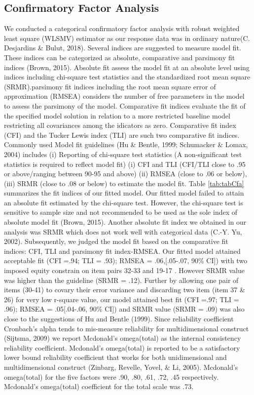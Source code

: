 \documentclass[
  english,
  man]{apa6}
\begin{document}
\hypertarget{confirmatory-factor-analysis}{%
\subsection{Confirmatory Factor Analysis}\label{confirmatory-factor-analysis}}

We conducted a categorical confirmatory factor analysis with robust weighted least square (WLSMV) estimator as our response data was in ordinary nature(C. Desjardins \& Bulut, 2018). Several indices are suggested to measure model fit. These indices can be categorized as absolute, comparative and parsimony fit indices (Brown, 2015). Absolute fit assess the model fit at an absolute level using indices including chi-square test statistics and the standardized root mean square (SRMR).parsimony fit indices including the root mean square error of approximation (RMSEA) considers the number of free parameters in the model to assess the parsimony of the model. Comparative fit indices evaluate the fit of the specified model solution in relation to a more restricted baseline model restricting all covariances among the idicators as zero. Comparative fit index (CFI) and the Tucker Lewis index (TLI) are such two comparative fit indices. Commonly used Model fit guidelines (Hu \& Bentle, 1999; Schumacker \& Lomax, 2004) includes (i) Reporting of chi-square test statistics (A non-significant test statistics is required to reflect model fit) (i) CFI and TLI (CFI/TLI close to .95 or above/ranging between 90-95 and above) (ii) RMSEA (close to .06 or below), (iii) SRMR (close to .08 or below) to estimate the model fit. Table \ref{tab:tabCfa} summarizes the fit indices of our fitted model. Our fitted model failed to attain an absolute fit estimated by the chi-square test. However, the chi-square test is sensitive to sample size and not recommended to be used as the sole index of absolute model fit (Brown, 2015). Another absolute fit index we obtained in our analysis was SRMR which does not work well with categorical data (C.-Y. Yu, 2002). Subsequently, we judged the model fit based on the comparative fit indices: CFI, TLI and parsimony fit index-RMSEA. Our fitted model attained acceptable fit (CFI =.94; TLI = .93); RMSEA = .06,{[}.05-.07, 90\% CI{]}) with two imposed equity constrain on item pairs 32-33 and 19-17 . However SRMR value was higher than the guideline (SRMR = .12). Further by allowing one pair of items (30-41) to covary their error variance and discarding two item (item 37 \& 26) for very low r-square value, our model attained best fit (CFI =.97; TLI = .96); RMSEA = .05{[}.04-.06, 90\% CI{]}) and SRMR value (SRMR = .09) was also close to the suggestions of Hu and Bentle (1999). Since reliability coefficient Cronbach's alpha tends to mis-measure reliability for multidimensional construct (Sijtsma, 2009) we report Mcdonald's omega(total) as the internal consistency reliability coefficient. Mcdonald's omega(total) is reported to be a satisfactory lower bound reliability coefficient that works for both unidimensional and multidimensional construct (Zinbarg, Revelle, Yovel, \& Li, 2005). Mcdonald's omega(total) for the five factors were .90, .80, .61, .72, .45 respectively. Mcdonald's omega(total) coefficient for the total scale was .73.
\end{document}
